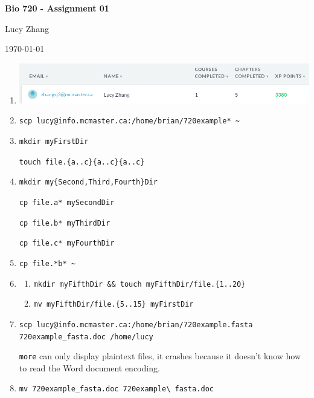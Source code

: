 \documentclass[12pt]{article}
\begin{document}
\begin{centering}
    \textbf{Bio 720 - Assignment 01}\par
    Lucy Zhang\par
    \today\par
\end{centering}                                           %

\begin{enumerate}
    \item \includegraphics[width=6.5in]{Screenshot_20180911_114301.png}
    \item \texttt{scp lucy@info.mcmaster.ca:/home/brian/720example* \~}
    \item \texttt{mkdir myFirstDir}\par
        \texttt{touch file.\{a..c\}\{a..c\}\{a..c\}}
    \item \texttt{mkdir my\{Second,Third,Fourth\}Dir}\par
        \texttt{cp file.a* mySecondDir}\par
        \texttt{cp file.b* myThirdDir}\par
        \texttt{cp file.c* myFourthDir}
    \item \texttt{cp file.*b* \~}
    \item 
        \begin{enumerate}[label=(\alph*),leftmargin=0.5in]
            \item\texttt{mkdir myFifthDir \&\& touch myFifthDir/file.\{1..20\}}
            \item\texttt{mv myFifthDir/file.\{5..15\} myFirstDir}
        \end{enumerate}
    \item \texttt{scp lucy@info.mcmaster.ca:/home/brian/720example.fasta 720example\_fasta.doc /home/lucy}\par
          \texttt{more} can only display plaintext files, it crashes because it doesn't know how to read the Word document encoding. 
    \item \texttt{mv 720example\_fasta.doc 720example\textbackslash { }fasta.doc}\par

\end{enumerate}
\end{document}
